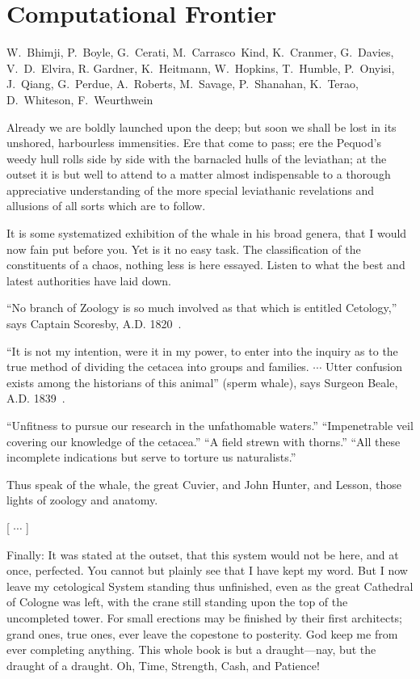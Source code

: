 
\setcounter{chapter}{8} 

\chapter{Computational Frontier}

{W.~Bhimji, P.~Boyle, G.~Cerati, M.~Carrasco~Kind, K.~Cranmer,  G.~Davies, V.~D.~Elvira, 
R. Gardner, K.~Heitmann, W.~Hopkins, T.~Humble, P.~Onyisi, J.~Qiang, 
G.~Perdue, A.~Roberts, M.~Savage, P.~Shanahan, K.~Terao, D.~Whiteson, F.~Weurthwein}


Already we are boldly launched upon the deep; but soon we shall be lost in its unshored, harbourless immensities. Ere that come to pass; ere the Pequod’s weedy hull rolls side by side with the barnacled hulls of the leviathan; at the outset it is but well to attend to a matter almost indispensable to a thorough appreciative understanding of the more special leviathanic revelations and allusions of all sorts which are to follow.

It is some systematized exhibition of the whale in his broad genera, that I would now fain put before you. Yet is it no easy task. The classification of the constituents of a chaos, nothing less is here essayed. Listen to what the best and latest authorities have laid down.

``No branch of Zoology is so much involved as that which is entitled Cetology,'' says Captain Scoresby, A.D. 1820~\cite{U-Scoresby}.

``It is not my intention, were it in my power, to enter into the inquiry as to the true method of dividing the cetacea into groups and families. $\cdots$ Utter confusion exists among the historians of this animal'' (sperm whale), says Surgeon Beale, A.D. 1839~\cite{U-Beale}.

``Unfitness to pursue our research in the unfathomable waters.'' ``Impenetrable veil covering our knowledge of the cetacea.''  ``A field strewn with thorns.'' ``All these incomplete indications but serve to torture us naturalists.''

Thus speak of the whale, the great Cuvier, and John Hunter, and Lesson, those lights of zoology and anatomy. 


[ $\cdots$ ]

Finally: It was stated at the outset, that this system would not be here, and at once, perfected. You cannot but plainly see that I have kept my word. But I now leave my cetological System standing thus unfinished, even as the great Cathedral of Cologne was left, with the crane still standing upon the top of the uncompleted tower. For small erections may be finished by their first architects; grand ones, true ones, ever leave the copestone to posterity. God keep me from ever completing anything. This whole book is but a draught---nay, but the draught of a draught. Oh, Time, Strength, Cash, and Patience!


